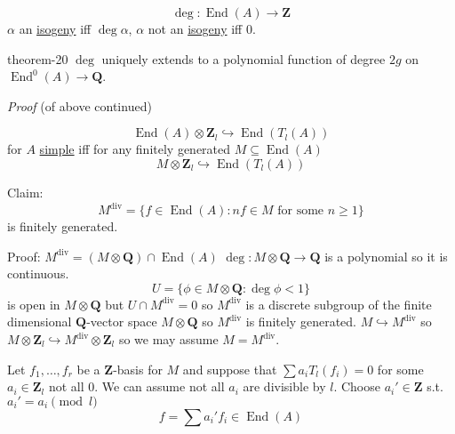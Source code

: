 \documentclass[10pt,]{book}
\makeatletter
\renewcommand*{\proofname}{Proof}
\renewenvironment{proof}[1][\proofname]{\par
  \pushQED{\qed}%
  \normalfont \topsep6\p@\@plus6\p@\relax
  \trivlist
  \item\relax
    {\itshape
    #1\@addpunct{.}}\hspace\labelsep\ignorespaces
}{%
  \popQED\endtrivlist\@endpefalse
}
\numberwithin{equation}{section}
\newcommand{\ZZ}{\mathbf{Z}}
\newcommand{\QQ}{\mathbf{Q}}
\DeclareMathOperator{\End}{End}
\newcommand{\lt}{<}
\makeatother
\begin{document}
\hypertarget{p-235}{}%
%
\begin{equation*}
\deg\colon \End(A) \to \ZZ
\end{equation*}
\(\alpha\) an \hyperref[def-supersing-isog-isog]{isogeny} iff \(\deg \alpha\), \(\alpha\) not an \hyperref[def-supersing-isog-isog]{isogeny} iff \(0\).%
\begin{theorem}{}{}{theorem-20}%
\hypertarget{p-236}{}%
\(\deg\) uniquely extends to a polynomial function of degree \(2g\) on \(\End^0(A) \to \QQ\).%
\end{theorem}
\begin{proof}\hypertarget{proof-44}{}
\hypertarget{p-237}{}%
(of above continued)%
\par
\hypertarget{p-238}{}%
%
\begin{equation*}
\End(A) \otimes \ZZ_l \hookrightarrow\End(T_l(A))
\end{equation*}
for \(A\) \hyperref[def-simple-av]{simple} iff for any finitely generated \(M \subseteq \End(A)\)%
\begin{equation*}
M \otimes \ZZ_l \hookrightarrow \End(T_l(A))
\end{equation*}
%
\par
\hypertarget{p-239}{}%
Claim:%
\begin{equation*}
M^{\text{div}} = \{f\in \End(A) : nf\in M \text{ for some }n\ge 1\}
\end{equation*}
is finitely generated.%
\par
\hypertarget{p-240}{}%
Proof: \(M^\text{div} = (M\otimes \QQ) \cap \End(A)\) \(\deg \colon M \otimes \QQ \to \QQ\) is a polynomial so it is continuous.%
\begin{equation*}
U = \{\phi\in M \otimes \QQ : \deg \phi \lt 1\}
\end{equation*}
is open in \(M \otimes \QQ\) but \(U \cap M^\text{div} = 0\) so \(M^\text{div} \) is a discrete subgroup of the finite dimensional \(\QQ\)-vector space \(M \otimes \QQ\) so \(M^\text{div}\) is finitely generated. \(M \hookrightarrow M^\text{div}\) so \(M \otimes \ZZ_l \hookrightarrow M^\text{div} \otimes \ZZ_l\) so  we may assume \(M = M^\text{div}\).%
\par
\hypertarget{p-241}{}%
Let \(f_1,\ldots, f_r\) be a \(\ZZ\)-basis for \(M\) and suppose that \(\sum a_iT_l(f_i)=0\) for some \(a_i \in \ZZ_l\) not all 0. We can assume not all \(a_i\) are divisible by \(l\). Choose \(a_i' \in \ZZ\) s.t. \(a_i'=a_i \pmod{l}\)%
\begin{equation*}
f = \sum a_i' f_i \in \End(A)
\end{equation*}

\end{proof}
\end{document}
